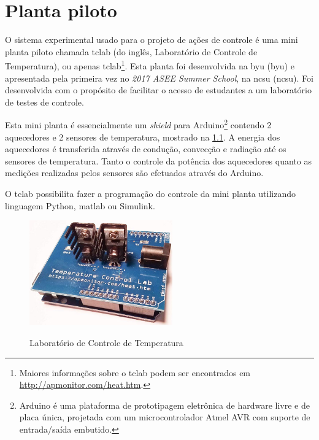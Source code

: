 
\chapter{Planta piloto}
\label{ch:planta_piloto}

O sistema experimental usado para o projeto de ações de controle é uma mini planta piloto chamada \acrlong{tclab}
(do inglês, Laboratório de Controle de Temperatura), ou apenas \acrshort{tclab}\footnote{                       %
    Maiores informações sobre o \acrshort{tclab} podem ser encontrados em \href{http://apmonitor.com/heat.htm}{http://apmonitor.com/heat.htm}.
}. Esta planta foi desenvolvida na \acrlong{byu} (\acrshort{byu}) e apresentada pela primeira vez no
\textit{2017 ASEE Summer School}, na \acrlong{ncsu} (\acrshort{ncsu}). Foi desenvolvida com o
propósito de facilitar o acesso de estudantes a um laboratório de testes de controle.

Esta mini planta é essencialmente um \textit{shield} para Arduino\footnote{
    Arduino é uma plataforma de prototipagem eletrônica de hardware livre e de placa única, projetada com um    %
    microcontrolador Atmel AVR com suporte de entrada/saída embutido.                                           %
} contendo 2 aquecedores e 2 sensores de temperatura, mostrado na \cref{fig:tclab}. A energia dos aquecedores é
transferida através de condução, convecção e radiação até os sensores de temperatura. Tanto o controle da
potência dos aquecedores quanto as medições realizadas pelos sensores são efetuados através do Arduino.

O \acrshort{tclab} possibilita fazer a programação do controle da mini planta utilizando linguagem Python,
\acrshort{matlab} ou Simulink.

\begin{figure}[h]
	\caption{Laboratório de Controle de Temperatura}
	\begin{center}
		\includegraphics[width=0.55\textwidth]{./5_images/tclab.png} 
		\label{fig:tclab}
	\end{center}
	\centering
\end{figure}

